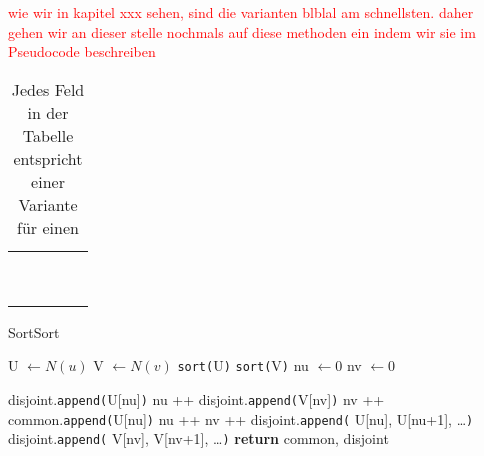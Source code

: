 

\textcolor{red}{wie wir in kapitel xxx sehen, sind die varianten blblal am schnellsten. daher gehen wir 
an dieser stelle nochmals auf diese methoden ein indem wir sie im Pseudocode beschreiben}


\begin{table}
	\centering
	\begin{tabular}{c||c|c||c|c}
		 & \multicolumn{2}{c||}{\distr} & \multicolumn{2}{c}{\perm} \\
		 & \true & \false & \true & \false
		\\ \hline\hline
		\SorSor & & & & \\ \hline\hline
		\SeaSor & & & &\\ \hline\hline
		\SorSea & & & &\\ \hline\hline
		\SeaSet & & & &\\ \hline\hline
		\SetSea & & & &\\ \hline\hline
		\SeaUSet & & & &\\ \hline\hline
		\USetSea& & & &
	\end{tabular}
	\label{tab:varianten_curveball_tausch}
	\caption{Jedes Feld in der Tabelle entspricht einer Variante für einen \ct}
\end{table}


\begin{algorithm}
  \caption{SortSort}\label{algo:sortsort}
  \begin{algorithmic}[1]
	  \State U $ \gets N(u)$ 
	  \State V $ \gets N(v)$ 
	  \State \texttt{sort(}U\texttt{)} \label{algo:inv1} 
	  \State \texttt{sort(}V\texttt{)} \label{algo:inv2}
	  \State nu $\gets 0$ 
	  \State nv $\gets 0$ 
	  
			\State disjoint.\texttt{append(}U[nu]\texttt{)}
			\State nu ++
				\State disjoint.\texttt{append(}V[nv]\texttt{)}
				\State nv ++
				\State common.\texttt{append(}U[nu]\texttt{)}
				\State nu ++
				\State nv ++
        \EndIf
      \EndWhile\label{euclidendwhile}
			\State disjoint.\texttt{append(} U[nu], U[nu+1], \dots\texttt{)}
			\Else{}
			\State disjoint.\texttt{append(} V[nv], V[nv+1], \dots\texttt{)}
      \EndIf
      \State \textbf{return} common, disjoint
   \EndProcedure
  \end{algorithmic}
\end{algorithm}



